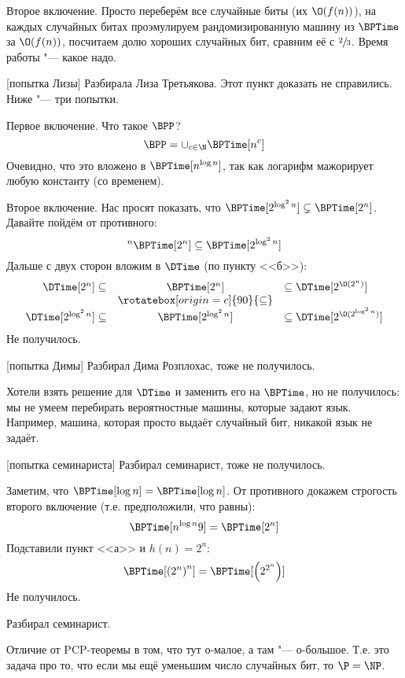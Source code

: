 	Второе включение.
	Просто переберём все случайные биты (их $\O(f(n))$), на каждых случайных битах проэмулируем рандомизированную машину из $\BPTime$
	за $\O(f(n))$, посчитаем долю хороших случайных бит, сравним её с $\sfrac 23$.
	Время работы "--- какое надо.

[попытка Лизы]
	Разбирала Лиза Третьякова.
	Этот пункт доказать не справились.
	Ниже "--- три попытки.

	Первое включение.
	Что такое $\BPP$?
	\[ \BPP = \cup_{c \in \N} \BPTime[n^c] \]
	Очевидно, что это вложено в $\BPTime[n^{\log n}]$, так как логарифм мажорирует любую константу (со временем).

	Второе включение.
	Нас просят показать, что $\BPTime[2^{\log^2n}] \subsetneq \BPTime[2^n]$.
	Давайте пойдём от противного:
	\[                                         ^n
		\BPTime[2^n] \subseteq \BPTime[2^{\log^2n}]
	\]
	Дальше с двух сторон вложим в $\DTime$ (по пункту <<б>>):
	\begin{gather*}
		\begin{array}{rcl}
			\DTime[2^n] \subseteq & \BPTime[2^n] & \subseteq \DTime[2^{\O(2^n)}] \\
			& \rotatebox[origin=c]{90}{\subseteq} & \\
			\DTime[2^{\log^2n}] \subseteq & \BPTime[2^{\log^2n}] & \subseteq \DTime[2^{\O(2^{\log^2 n})}]
		\end{array}
	\end{gather*}
	Не получилось.

[попытка Димы]
	Разбирал Дима Розплохас, тоже не получилось.

	Хотели взять решение для $\DTime$ и заменить его на $\BPTime$, но не получилось:
	мы не умеем перебирать вероятностные машины, которые задают язык.
	Например, машина, которая просто выдаёт случайный бит, никакой язык не задаёт.

[попытка семинариста]
	Разбирал семинарист, тоже не получилось.

	Заметим, что $\BPTime[\log n] = \BPTime[\log n]$.
	От противного докажем строгость второго включение (т.е. предположили, что равны):
	\[
		\BPTime[n^{\log n}9] = \BPTime[2^n]
	\]
	Подставили пункт <<а>> и $h(n)=2^n$:
	\[
		\BPTime[\left(2^n\right)^n] = \BPTime[\left(2^{2^n}\right)]
	\]
	Не получилось.

	Разбирал семинарист.

	Отличие от PCP-теоремы в том, что тут о-малое, а там "--- о-большое.
	Т.е. это задача про то, что если мы ещё уменьшим число случайных бит, то $\P=\NP$.

